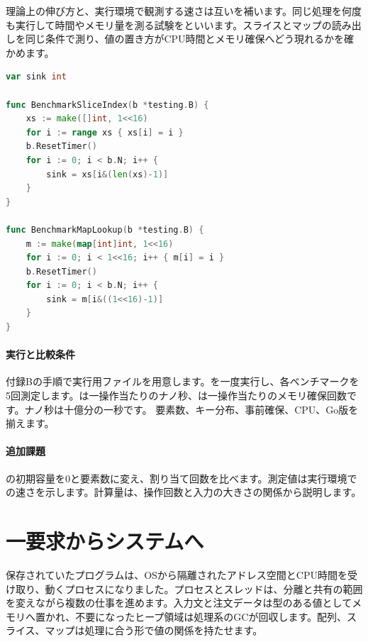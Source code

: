 理論上の伸び方と、実行環境で観測する速さは互いを補います。同じ処理を何度も実行して時間やメモリ量を測る試験をといいます。スライスとマップの読み出しを同じ条件で測り、値の置き方がCPU時間とメモリ確保へどう現れるかを確かめます。

\begingroup
\begingroup
      \begin{lstlisting}[language=Go]
var sink int

func BenchmarkSliceIndex(b *testing.B) {
    xs := make([]int, 1<<16)
    for i := range xs { xs[i] = i }
    b.ResetTimer()
    for i := 0; i < b.N; i++ {
        sink = xs[i&(len(xs)-1)]
    }
}

func BenchmarkMapLookup(b *testing.B) {
    m := make(map[int]int, 1<<16)
    for i := 0; i < 1<<16; i++ { m[i] = i }
    b.ResetTimer()
    for i := 0; i < b.N; i++ {
        sink = m[i&((1<<16)-1)]
    }
}
      \end{lstlisting}
\par
\endgroup
\medskip
\begingroup
\paragraph{実行と比較条件}
        付録Bの手順で実行用ファイルを用意します。を一度実行し、各ベンチマークを5回測定します。は一操作当たりのナノ秒、は一操作当たりのメモリ確保回数です。ナノ秒は十億分の一秒です。
        要素数、キー分布、事前確保、CPU、Go版を揃えます。

\paragraph{追加課題}
        の初期容量を0と要素数に変え、割り当て回数を比べます。測定値は実行環境での速さを示します。計算量は、操作回数と入力の大きさの関係から説明します。

\par
\endgroup
\par
\endgroup


\section{一要求からシステムへ}
\label{sec:03-runtime-data-20}

保存されていたプログラムは、OSから隔離されたアドレス空間とCPU時間を受け取り、動くプロセスになりました。プロセスとスレッドは、分離と共有の範囲を変えながら複数の仕事を進めます。入力文と注文データは型のある値としてメモリへ置かれ、不要になったヒープ領域は処理系のGCが回収します。配列、スライス、マップは処理に合う形で値の関係を持たせます。


